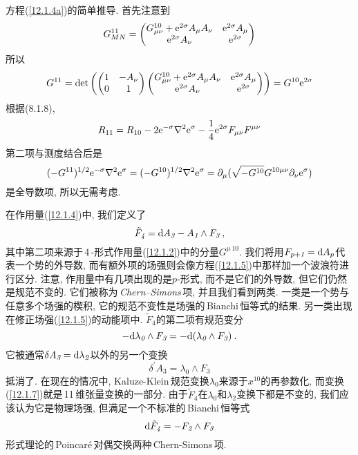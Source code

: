 \begin{tcolorbox}
方程(\ref{12.1.4a})的简单推导. 首先注意到
\[
 G_{MN}^{11}=\begin{pmatrix}
     G_{\mu\nu}^{10}+\mathrm{e}^{2\sigma} A_{\mu}A_{\nu} & \mathrm{e}^{2\sigma}A_{\mu} \\
     \mathrm{e}^{2\sigma} A_{\nu} &\mathrm{e}^{2\sigma}
 \end{pmatrix}    
 \]
 所以
 \[
    G^{11}=\operatorname{det} \left(\begin{pmatrix}
        1 & -A_{\nu} \\
        0 & 1
    \end{pmatrix}    \begin{pmatrix}
        G_{\mu\nu}^{10}+\mathrm{e}^{2\sigma} A_{\mu}A_{\nu} & \mathrm{e}^{2\sigma}A_{\mu} \\
        \mathrm{e}^{2\sigma} A_{\nu} &\mathrm{e}^{2\sigma}
    \end{pmatrix}    \right)   = G^{10} \mathrm{e}^{2\sigma}
\]
根据(\textcolor{foo}{8.1.8}),
\[
            R_{11}=R_{10}-2\mathrm{e}^{-\sigma} \nabla^{2} \mathrm{e}^{\sigma} -\frac{1}{4}\mathrm{e}^{2\sigma}F_{\mu\nu}F^{\mu\nu}  
\]
第二项与测度结合后是 
\[ 
    (-G^{11})^{1/2}\mathrm{e}^{-\sigma} \nabla^{2} \mathrm{e}^{\sigma}=(-G^{10})^{1/2}\nabla^{2}\mathrm{e}^{\sigma}=\partial_{\mu}(\sqrt{-G^{10}}G^{10\mu\nu}\partial_{\nu}\mathrm{e}^{\sigma})
\]    
是全导数项, 所以无需考虑.
\end{tcolorbox}
   
在作用量(\ref{12.1.4})中, 我们定义了
\begin{equation}
    \tilde{F}_{\textit{4}}= \mathrm{d} A_{\textit{3}}-A_{\textit{1}}\wedge F_{\textit{3}} \:, \label{12.1.5}
\end{equation}
其中第二项来源于\,4\,-形式作用量(\ref{12.1.2})中的分量$ G^{\mu\,10}$. 我们将用$ F_{p+\textit{1}}=\mathrm{d} A_{p} $代表一个势的外导数, 而有额外项的场强则会像方程(\ref{12.1.5})中那样加一个波浪符进行区分. 注意, 作用量中有几项出现的是$ p $-形式, 而不是它们的外导数, 但它们仍然是规范不变的. 它们被称为\,\textit{Chern--Simons}\,项, 并且我们看到两类. 一类是一个势与任意多个场强的楔积, 它的规范不变性是场强的\,Bianchi\,恒等式的结果. 另一类出现在修正场强(\ref{12.1.5})的动能项中. $\tilde{F}_{\textit{4}} $的第二项有规范变分
\begin{equation}
    {-}\mathrm{d}\lambda_{\textit{0}} \wedge F_{\textit{3}} = - \mathrm{d}(\lambda_{\textit{0}}\wedge F_{\textit{3}}) \:. \label{12.1.6}
\end{equation}
它被通常$\delta A_{\textit{3}}=\mathrm{d}\lambda_{\textit{2}} $以外的另一个变换
\begin{equation}
    \delta^{\prime}A_{\textit{3}}=\lambda_{\textit{0}}\wedge F_{\textit{3}} \label{12.1.7}
\end{equation}
抵消了. 在现在的情况中, Kaluze-Klein\,规范变换$ \lambda_{\textit{0}} $来源于$ x^{10} $的再参数化, 而变换(\ref{12.1.7})就是\,11\,维张量变换的一部分. 由于$ \tilde{F}_{\textit{4}} $在$ \lambda_{\textit{0}} $和$ \lambda_{\textit{2}} $变换下都是不变的, 我们应该认为它是物理场强, 但满足一个不标准的\,Bianchi\,恒等式
\begin{equation}
    \mathrm{d} \tilde{F}_{\textit{4}}=-F_{\textit{2}}\wedge F_{\textit{3}}
\end{equation}
形式理论的\,Poincar\'{e}\,对偶交换两种\,Chern-Simons\,项.

